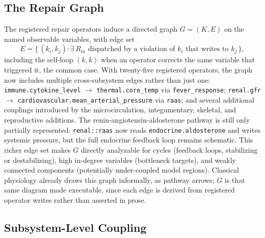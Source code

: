 \documentclass[11pt]{article}
\begin{document}
\subsection{The Repair Graph}

The registered repair operators induce a directed graph $G = (K, E)$ on the named observable variables, with edge set
\[
E = \{\, (k_i, k_j) : \exists\, R_m \text{ dispatched by a violation of } k_i \text{ that writes to } k_j \,\},
\]
including the self-loop $(k, k)$ when an operator corrects the same variable that triggered it, the common case. With twenty-five registered operators, the graph now includes multiple cross-subsystem edges rather than just one: \texttt{immune.cytokine\_level} $\rightarrow$ \texttt{thermal.core\_temp} via \texttt{fever\_response}; \texttt{renal.gfr} $\rightarrow$ \texttt{cardiovascular.mean\_arterial\_pressure} via \texttt{raas}; and several additional couplings introduced by the microcirculation, integumentary, skeletal, and reproductive additions. The renin-angiotensin-aldosterone pathway is still only partially represented: \texttt{renal::raas} now reads \texttt{endocrine.aldosterone} and writes systemic pressure, but the full endocrine feedback loop remains schematic. This richer edge set makes $G$ directly analyzable for cycles (feedback loops, stabilizing or destabilizing), high in-degree variables (bottleneck targets), and weakly connected components (potentially under-coupled model regions). Classical physiology already draws this graph informally, as pathway arrows; $G$ is that same diagram made executable, since each edge is derived from registered operator writes rather than asserted in prose.

\subsection{Subsystem-Level Coupling}
\end{document}
